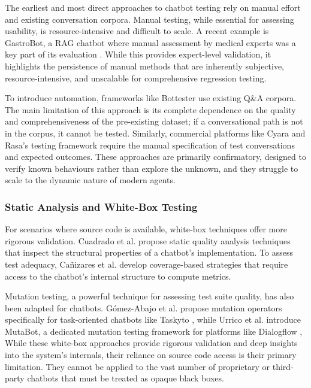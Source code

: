 The earliest and most direct approaches to chatbot testing
rely on manual effort and existing conversation corpora.
Manual testing, while essential for assessing usability,
is resource-intensive and difficult to scale.
A recent example is GastroBot,
a \ac{RAG} chatbot where manual assessment by medical experts
was a key part of its evaluation \autocite{zhouGastroBotChineseGastrointestinal2024}.
While this provides expert-level validation,
it highlights the persistence of manual methods
that are inherently subjective, resource-intensive,
and unscalable for comprehensive regression testing.

To introduce automation, frameworks like Bottester
\autocite{vasconcelosBottesterTestingConversational2017}
use existing Q\&A corpora.
The main limitation of this approach
is its complete dependence on
the quality and comprehensiveness of the pre-existing dataset;
if a conversational path is not in the corpus, it cannot be tested.
Similarly, commercial platforms like Cyara \autocite{CyaraBotium}
and Rasa's testing framework \autocite{RasaTest2025}
require the manual specification of test conversations and expected outcomes.
These approaches are primarily confirmatory,
designed to verify known behaviours rather than explore the unknown,
and they struggle to scale to the dynamic nature of modern agents.

\subsubsection{Static Analysis and White-Box Testing}

For scenarios where source code is available,
white-box techniques offer more rigorous validation.
Cuadrado et al. \autocite{cuadradoIntegratingStaticQuality2024}
propose static quality analysis techniques
that inspect the structural properties of a chatbot's implementation.
To assess test adequacy, Cañizares et al.
\autocite{canizaresCoveragebasedStrategiesAutomated2024}
develop coverage-based strategies that
require access to the chatbot's internal structure to compute metrics.

Mutation testing, a powerful technique for assessing test suite quality,
has also been adapted for chatbots.
Gómez-Abajo et al. \autocite{gomez-abajoMutationTestingTaskOriented2024}
propose mutation operators specifically for task-oriented chatbots like Taskyto \autocite{sanchezcuadradoAutomatingDevelopmentTaskoriented2024},
while Urrico et al. \autocite{urricoMutaBotMutationTesting2024} introduce MutaBot,
a dedicated mutation testing framework for platforms like Dialogflow \autocite{Dialogflow},
While these white-box approaches provide rigorous validation
and deep insights into the system's internals,
their reliance on source code access
is their primary limitation.
They cannot be applied to the vast number of
proprietary or third-party chatbots
that must be treated as opaque black boxes.

